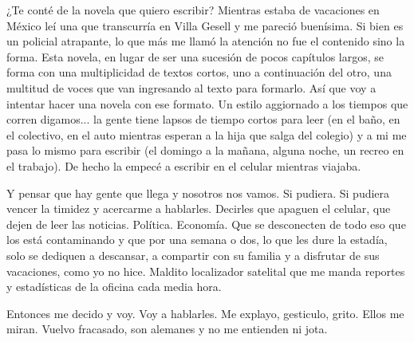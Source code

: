 \documentclass[12pt,twoside,openright,a5paper]{book}
\begin{document}
\vspace{0.5cm}
\hrulefill\hspace{0.2cm} \decofourleft\decofourright \hspace{0.2cm} \hrulefill
\vspace{0.5cm}

¿Te conté de la novela que quiero escribir? Mientras
estaba de vacaciones en México leí una que transcurría en Villa
Gesell y me pareció buenísima. Si bien es un policial atrapante, lo que
más me llamó la atención no fue el contenido sino la forma. Esta novela,
en lugar de ser una sucesión de pocos capítulos largos, se forma con una
multiplicidad de textos cortos, uno a continuación del otro, una multitud
de voces que van ingresando al texto para formarlo. Así que voy a intentar
hacer una novela con ese formato. Un estilo aggiornado a los tiempos que
corren digamos... la gente tiene lapsos de tiempo cortos para leer (en el
baño, en el colectivo, en el auto mientras esperan a la hija que salga del
colegio) y a mi me pasa lo mismo para escribir (el domingo a la mañana,
alguna noche, un recreo en el trabajo). De hecho la empecé a escribir en
el celular mientras viajaba.


\vspace{0.5cm}
\hrulefill\hspace{0.2cm} \decofourleft\decofourright \hspace{0.2cm} \hrulefill
\vspace{0.5cm}

Y pensar que hay gente que llega y nosotros
nos vamos. Si pudiera. Si pudiera vencer la timidez y acercarme
a hablarles. Decirles que apaguen el celular, que dejen de leer las
noticias. Política. Economía. Que se desconecten de todo eso que los está
contaminando y que por una semana o dos, lo que les dure la estadía, solo
se dediquen a descansar, a compartir con su familia y a disfrutar de sus
vacaciones, como yo no hice. Maldito localizador satelital que me manda
reportes y estadísticas de la oficina cada media hora.

Entonces me decido y voy. Voy a hablarles. Me explayo, gesticulo,
grito. Ellos me miran. Vuelvo fracasado, son alemanes y no me entienden
ni jota.


\vspace{0.5cm}
\hrulefill\hspace{0.2cm} \decofourleft\decofourright \hspace{0.2cm} \hrulefill
\vspace{0.5cm}
\end{document}
